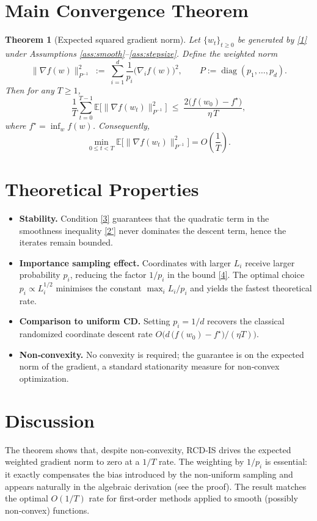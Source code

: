 \documentclass{article}
\newcommand{\E}{\mathbb{E}}
\newtheorem{theorem}{Theorem}
\begin{document}
\section*{Main Convergence Theorem}
\begin{theorem}[Expected squared gradient norm]\label{thm:main}
Let $\{w_{t}\}_{t\ge0}$ be generated by \eqref{1} under Assumptions
\ref{ass:smooth}–\ref{ass:stepsize}. Define the weighted norm
\[
\| \nabla f(w)\|_{P^{-1}}^{2}\;:=\;\sum_{i=1}^{d}\frac{1}{p_{i}}\bigl(\nabla_{i}f(w)\bigr)^{2},
\qquad
P:=\operatorname{diag}(p_{1},\dots,p_{d}).
\]
Then for any $T\ge1$,
\[
\frac{1}{T}\sum_{t=0}^{T-1}\E\!\bigl[\|\nabla f(w_{t})\|_{P^{-1}}^{2}\bigr]
\;\le\;
\frac{2\bigl(f(w_{0})-f^{\star}\bigr)}{\eta\,T},
\tag{4}
\]
where $f^{\star}= \inf_{w}f(w)$.
Consequently,
\[
\min_{0\le t<T}\E\!\bigl[\|\nabla f(w_{t})\|_{P^{-1}}^{2}\bigr]
=O\!\left(\frac{1}{T}\right).
\]
\end{theorem}

\section*{Theoretical Properties}
\begin{itemize}[leftmargin=*]
\item \textbf{Stability.} Condition \eqref{3} guarantees that the quadratic term
in the smoothness inequality \eqref{2'} never dominates the descent term,
hence the iterates remain bounded.
\item \textbf{Importance sampling effect.} Coordinates with larger $L_{i}$
receive larger probability $p_{i}$, reducing the factor $1/p_{i}$ in the bound
\eqref{4}. The optimal choice $p_{i}\propto L_{i}^{1/2}$ minimises the constant
$\max_{i}L_{i}/p_{i}$ and yields the fastest theoretical rate.
\item \textbf{Comparison to uniform CD.} Setting $p_{i}=1/d$ recovers the
classical randomized coordinate descent rate
$O\bigl(d\,\bigl(f(w_{0})-f^{\star}\bigr)/(\eta T)\bigr)$.
\item \textbf{Non‑convexity.} No convexity is required; the guarantee is on the
expected norm of the gradient, a standard stationarity measure for non‑convex
optimization.
\end{itemize}

\section*{Discussion}
The theorem shows that, despite non‑convexity, RCD‑IS drives the
expected weighted gradient norm to zero at a $1/T$ rate. The weighting by
$1/p_{i}$ is essential: it exactly compensates the bias introduced by the
non‑uniform sampling and appears naturally in the algebraic derivation
(see the proof). The result matches the optimal $O(1/T)$ rate for
first‑order methods applied to smooth (possibly non‑convex) functions.
\end{document}
